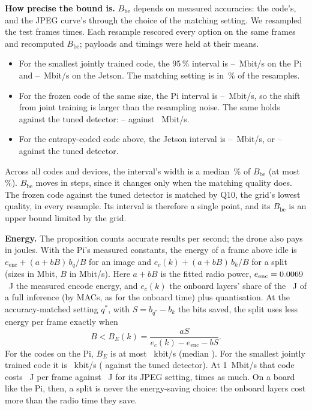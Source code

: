\textbf{How precise the bound is.} $B_{\mathrm{be}}$ depends on measured accuracies: the code's, and the JPEG curve's
through the choice of the matching setting. We resampled the test frames \BeCiBoot{} times. Each resample rescored
every option on the same frames and recomputed $B_{\mathrm{be}}$; payloads and timings were held at their means.
\begin{itemize}
\item For the smallest jointly trained code, the 95\,\% interval is \BeCiJointPiLo--\BeCiJointPiHi~Mbit/s on the Pi
and \BeCiJointFastLo--\BeCiJointFastHi~Mbit/s on the Jetson. The matching setting is \BeJointPiQstar{} in
\BeCiJointPiQShare\,\% of the resamples.
\item For the frozen code of the same size, the Pi interval is \BeCiFrozenPiLo--\BeCiFrozenPiHi~Mbit/s, so the shift
from joint training is larger than the resampling noise. The same holds against the tuned detector: \BeCiTunedJointPiLo--\BeCiTunedJointPiHi{}
against \BeCiTunedFrozenPiLo~Mbit/s.
\item For the entropy-coded code above, the Jetson interval is \BeCiEcPairFastLo--\BeCiEcPairFastHi~Mbit/s, or
\BeCiTunedEcPairFastLo--\BeCiTunedEcPairFastHi{} against the tuned detector.
\end{itemize}
Across all codes and devices, the interval's width is a median \BeCiRelWidthMedian\,\% of $B_{\mathrm{be}}$ (at most
\BeCiRelWidthMax\,\%). $B_{\mathrm{be}}$ moves in steps, since it changes only when the matching quality does. The
frozen code against the tuned detector is matched by Q10, the grid's lowest quality, in every resample. Its interval
is therefore a single point, and its $B_{\mathrm{be}}$ is an upper bound limited by the grid.

\textbf{Energy.} The proposition counts accurate results per second; the drone also pays in joules. With the Pi's
measured constants, the energy of a frame above idle is $e_{\mathrm{enc}} + (a + bB)\,b_q/B$ for an image and
$e_c(k) + (a + bB)\,b_k/B$ for a split (sizes in Mbit, $B$ in Mbit/s). Here $a + bB$ is the fitted radio power, $e_{\mathrm{enc}} = 0.0069$~J the
measured encode energy, and $e_c(k)$ the onboard layers' share of the \BeEnComputeJ~J of a full inference (by MACs,
as for the onboard time) plus quantisation. At the accuracy-matched setting $q^\ast$, with $S = b_{q^\ast} - b_k$ the
bits saved, the split uses less energy per frame exactly when
\begin{equation*}
B < B_E(k) = \frac{aS}{e_c(k) - e_{\mathrm{enc}} - bS}.
\end{equation*}
For the \BeEnCodes{} codes on the Pi, $B_E$ is at most \BeEnMax~kbit/s (median \BeEnMedian). For the smallest jointly
trained code it is \BeEnJointPi~kbit/s (\BeEnTunedJointPi{} against the tuned detector). At 1~Mbit/s that code costs
\BeEnJointSplitJ~J per frame against \BeEnJointImageJ~J for its JPEG setting, \BeEnJointRatio{} times as much. On a
board like the Pi, then, a split is never the energy-saving choice: the onboard layers cost more than the radio time
they save.

